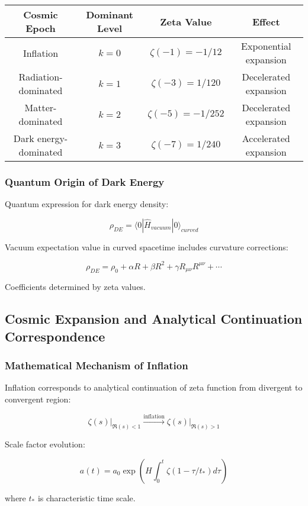 \documentclass[12pt,a4paper]{article}
\begin{document}
\begin{center}
\begin{tabular}{|c|c|c|c|}
\hline
Cosmic Epoch & Dominant Level & Zeta Value & Effect \\
\hline
Inflation & $k=0$ & $\zeta(-1) = -1/12$ & Exponential expansion \\
Radiation-dominated & $k=1$ & $\zeta(-3) = 1/120$ & Decelerated expansion \\
Matter-dominated & $k=2$ & $\zeta(-5) = -1/252$ & Decelerated expansion \\
Dark energy-dominated & $k=3$ & $\zeta(-7) = 1/240$ & Accelerated expansion \\
\hline
\end{tabular}
\end{center}

\subsubsection{Quantum Origin of Dark Energy}

Quantum expression for dark energy density:

$$\rho_{DE} = \langle 0 | \hat{H}_{vacuum} | 0 \rangle_{curved}$$

Vacuum expectation value in curved spacetime includes curvature corrections:

$$\rho_{DE} = \rho_0 + \alpha R + \beta R^2 + \gamma R_{\mu\nu}R^{\mu\nu} + \cdots$$

Coefficients determined by zeta values.

\subsection{Cosmic Expansion and Analytical Continuation Correspondence}

\subsubsection{Mathematical Mechanism of Inflation}

Inflation corresponds to analytical continuation of zeta function from divergent to convergent region:

$$\zeta(s) \bigg|_{\Re(s) < 1} \xrightarrow{\text{inflation}} \zeta(s) \bigg|_{\Re(s) > 1}$$

Scale factor evolution:

$$a(t) = a_0 \exp\left(H \int_0^t \zeta(1-\tau/t_*) d\tau\right)$$

where $t_*$ is characteristic time scale.
\end{document}

